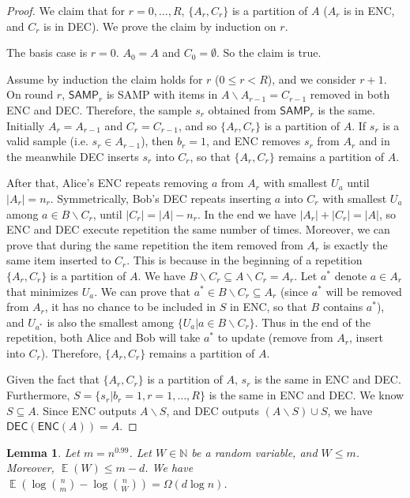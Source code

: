 \documentclass[10pt]{article}
\newtheorem{lemma}{Lemma}
\DeclareMathOperator*{\E}{\mathbb{E}}
\newcommand{\samp}{\textsf{SAMP}\xspace}
\newcommand{\enc}{\textsf{ENC}\xspace}
\newcommand{\dec}{\textsf{DEC}\xspace}
\begin{document}
\begin{proof}
  We claim that for $r=0,\ldots, R$, $\{A_r, C_r\}$ is a partition of $A$ ($A_r$ is in \enc, and $C_r$ is in \dec). We prove the claim by induction on $r$.
  
  The basis case is $r=0$. $A_0=A$ and $C_0=\emptyset$. So the claim is true.
  
  Assume by induction the claim holds for $r$ ($0\le r < R$), and we consider $r+1$. 
  On round $r$, $\samp_r$ is \samp with items in $A\backslash A_{r-1}=C_{r-1}$ removed in both \enc and \dec. Therefore, the sample $s_r$ obtained from $\samp_r$ is the same. Initially $A_r=A_{r-1}$ and $C_r=C_{r-1}$, and so $\{A_r,C_r\}$ is a partition of $A$. If $s_r$ is a valid sample (i.e. $s_r\in A_{r-1}$), then $b_r=1$, and \enc removes $s_r$ from $A_r$ and in the meanwhile \dec inserts $s_r$ into $C_r$, so that $\{A_r, C_r\}$ remains a partition of $A$. 
  
  After that, Alice's \enc repeats removing $a$ from $A_r$ with smallest $U_a$ until $|A_r|=n_r$. Symmetrically, Bob's \dec repeats inserting $a$ into $C_r$ with smallest $U_a$ among $a\in B\backslash C_r$, until $|C_r|=|A|-n_r$. In the end we have $|A_r|+|C_r|=|A|$, so \enc and \dec execute repetition the same number of times. Moreover, we can prove that during the same repetition the item removed from $A_r$ is exactly the same item inserted to $C_r$. This is because in the beginning of a repetition $\{A_r, C_r\}$ is a partition of $A$. We have $B\backslash C_r\subseteq A\backslash C_r=A_r$. Let $a^*$ denote  $a\in A_r$ that minimizes $U_a$. We can prove that $a^*\in B\backslash C_r\subseteq A_r$ (since $a^*$ will be removed from $A_r$, it has no chance to be included in $S$ in \enc, so that $B$ contains $a^*$), and $U_{a^*}$ is also the smallest among $\{U_a|a\in B\backslash C_r\}$. Thus in the end of the repetition, both Alice and Bob will take $a^{*}$ to update (remove from $A_r$, insert into $C_r$). Therefore, $\{A_r, C_r\}$ remains a partition of $A$.
  
  Given the fact that $\{A_r, C_r\}$ is a partition of $A$, $s_r$ is the same in \enc and \dec. Furthermore, $S=\{s_r|b_r=1,r=1,\ldots, R\}$ is the same in \enc and \dec. We know $S\subseteq A$. Since \enc outputs $A\backslash S$, and \dec outputs $(A\backslash S)\cup S$, we have $\dec(\enc(A))=A$. 
\end{proof}

\begin{lemma} \label{lemma:bits-saving}
  Let $m=n^{0.99}$. Let $W\in \mathbb{N}$ be a random variable, and $W\le m$. Moreover, $\E(W)\le m-d$. We have $\E(\log {n \choose m}-\log {n \choose W})=\Omega(d \log n)$.
\end{lemma}
\end{document}
